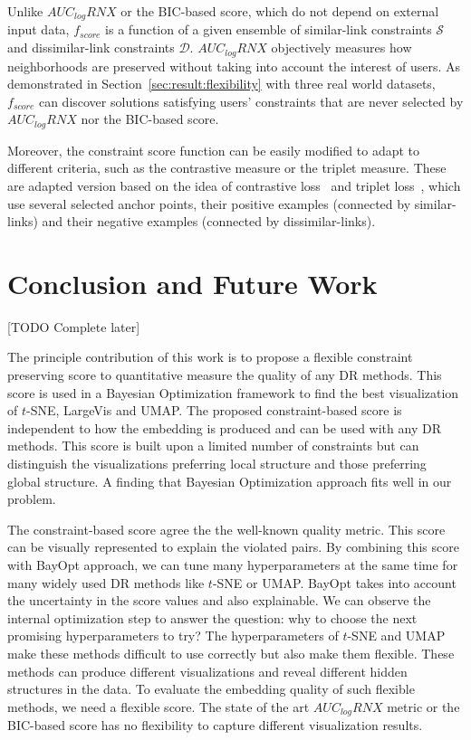 Unlike $AUC_{log}RNX$ or the BIC-based score, which do not depend on external input data, $f_{score}$ is a function of a given ensemble of similar-link constraints $\mathcal{S}$ and dissimilar-link constraints $\mathcal{D}$.
$AUC_{log}RNX$ objectively measures how neighborhoods are preserved without taking into account the interest of users.
As demonstrated in Section~\ref{sec:result:flexibility} with three real world datasets, $f_{score}$ can discover solutions satisfying users' constraints that are never selected by $AUC_{log}RNX$ nor the BIC-based score.

Moreover, the constraint score function can be easily modified to adapt to different criteria, such as the contrastive measure or the triplet measure.
These are adapted version based on the idea of contrastive loss~\cite{logeswaran2018efficient} and triplet loss~\cite{schroff2015facenet}, which use several selected anchor points, their positive examples (connected by similar-links) and their negative examples (connected by dissimilar-links).

\section{Conclusion and Future Work}\label{sec:conclusion}

[TODO Complete later]

The principle contribution of this work is to propose a flexible constraint preserving score to quantitative measure the quality of any DR methods.
This score is used in a Bayesian Optimization framework to find the best visualization of $t$-SNE, LargeVis and UMAP.
The proposed constraint-based score is independent to how the embedding is produced and can be used with any DR methods.
This score is built upon a limited number of constraints but can distinguish the visualizations preferring local structure and those preferring global structure.
A finding that Bayesian Optimization approach fits well in our problem.

The constraint-based score agree the the well-known quality metric.
This score can be visually represented to explain the violated pairs.
By combining this score with BayOpt approach, we can tune many hyperparameters at the same time for many widely used DR methods like $t$-SNE or UMAP.
BayOpt takes into account the uncertainty in the score values and also explainable. We can observe the internal optimization step to answer the question: why to choose the next promising hyperparameters to try?
The hyperparameters of $t$-SNE and UMAP make these methods difficult to use correctly but also make them flexible.
These methods can produce different visualizations and reveal different hidden structures in the data.
To evaluate the embedding quality of such flexible methods, we need a flexible score.
The state of the art $AUC_{log}RNX$ metric or the BIC-based score has no flexibility to capture different visualization results.

